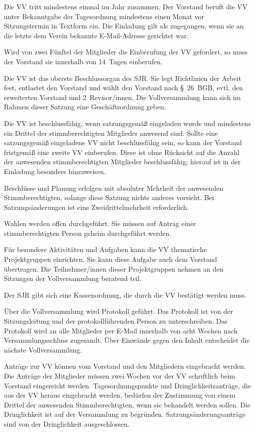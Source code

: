 \documentclass[10pt,a4paper,oneside,parskip=half]{scrartcl}
\begin{document}
\begin{contract}
Die VV tritt mindestens einmal im Jahr zusammen. Der Vorstand beruft die VV unter Bekanntgabe der Tagesordnung mindestens einen Monat vor Sitzungstermin in Textform ein. Die Einladung gilt als zugegangen, wenn sie an die letzte dem Verein bekannte E-Mail-Adresse gerichtet war.

Wird von zwei Fünftel der Mitglieder die Einberufung der VV gefordert, so muss der Vorstand sie innerhalb von 14~Tagen einberufen.

Die VV ist das oberste Beschlussorgan des SJR. Sie legt Richtlinien der Arbeit fest, entlastet den Vorstand und wählt den Vorstand nach §~26~BGB, evtl. den erweiterten Vorstand und 2~Revisor/innen. Die Vollversammlung kann sich im Rahmen dieser Satzung eine Geschäftsordnung geben.

Die VV ist beschlussfähig, wenn satzungsgemäß eingeladen wurde und mindestens ein Drittel der stimmberechtigten Mitglieder anwesend sind. Sollte eine satzungsgemäß eingeladene VV nicht beschlussfähig sein, so kann der Vorstand fristgemäß eine zweite VV einberufen. Diese ist ohne Rücksicht auf die Anzahl der anwesenden stimmberechtigten Mitglieder beschlussfähig; hierauf ist in der Einladung besonders hinzuweisen.

Beschlüsse und Planung erfolgen mit absoluter Mehrheit der anwesenden Stimmberechtigten, solange diese Satzung nichts anderes vorsieht. Bei Satzungsänderungen ist eine Zweidrittelmehrheit erforderlich.

Wahlen werden offen durchgeführt. Sie müssen auf Antrag einer stimmberechtigten Person geheim durchgeführt werden.

Für besondere Aktivitäten und Aufgaben kann die VV thematische Projektgruppen einrichten. Sie kann diese Aufgabe auch dem Vorstand übertragen. Die Teilnehmer/innen dieser Projektgruppen nehmen an den Sitzungen der Vollversammlung beratend teil.

Der SJR gibt sich eine Kassenordnung, die durch die VV bestätigt werden muss.

Über die Vollversammlung wird Protokoll geführt. Das Protokoll ist von der Sitzungsleitung und der protokollführenden Person zu unterschreiben. Das Protokoll wird an alle Mitglieder per E-Mail innerhalb von acht Wochen nach Versammlungsschluss zugesandt. Über Einwände gegen den Inhalt entscheidet die nächste Vollversammlung.

Anträge zur VV können vom Vorstand und den Mitgliedern eingebracht werden. Die Anträge der Mitglieder müssen zwei Wochen vor der VV schriftlich beim Vorstand eingereicht werden. Tagesordnungspunkte und Dringlichkeitsanträge, die aus der VV heraus eingebracht werden, bedürfen der Zustimmung von einem Drittel der anwesenden Stimmberechtigten, wenn sie behandelt werden sollen. Die Dringlichkeit ist auf der Versammlung zu begründen. Satzungsänderungsanträge sind von der Dringlichkeit ausgeschlossen.


\end{contract}
\end{document}
